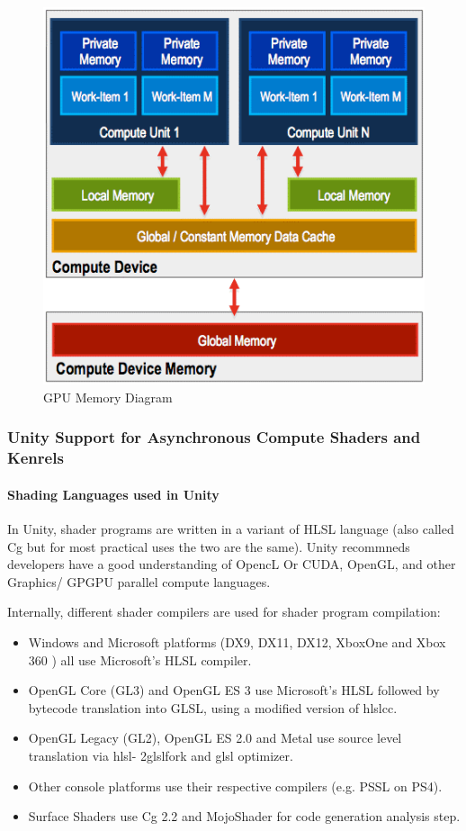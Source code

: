 \documentclass[a4paper,10pt]{article}
\begin{document}
	\begin{figure}[H]
	\centerline{ \includegraphics[scale=0.5]{gpuMem.png}}
	\caption{GPU Memory Diagram}
	\label{fig:gpuMem}
	\end{figure}
\pagebreak



\subsubsection{Unity Support for Asynchronous Compute Shaders and Kenrels}
\paragraph{Shading Languages used in Unity} 
In Unity, shader programs are written in a variant of HLSL language (also called Cg but for most practical uses the two are the same). Unity recommneds developers have a good understanding 
of OpencL Or CUDA, OpenGL, and other Graphics/ GPGPU parallel compute languages.  

Internally, different shader compilers are used for shader program compilation:\cite{unityShaders}
\begin{itemize}
  \item Windows and Microsoft platforms (DX9, DX11, DX12, XboxOne and Xbox 360 ) all use Microsoft's HLSL compiler.
  \item OpenGL Core (GL3) and OpenGL ES 3 use Microsoft’s HLSL followed by bytecode translation into GLSL, using a modified version of hlslcc.
  \item OpenGL Legacy (GL2), OpenGL ES 2.0 and Metal use source level 
  translation via
  hlsl- 2glslfork and glsl optimizer. 
  \item Other console platforms use their respective compilers (e.g. PSSL on PS4).
  \item Surface Shaders use Cg 2.2 and MojoShader for code generation analysis step.
\end{itemize} %
\end{document}
